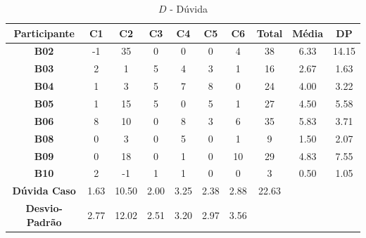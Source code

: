 \begin{table}[htbp]
	\centering
	\caption{$D$ - Dúvida}
	\begin{tabular}{|c|c|c|c|c|c|c|ccc}
		\hline
		\rowcolor[HTML]{D9D9D9} 
		\cellcolor[HTML]{D0CECE}\textbf{Participante} & \textbf{C1} & \textbf{C2} & \textbf{C3} & \textbf{C4} & \textbf{C5} & \textbf{C6} & \multicolumn{1}{c|}{\cellcolor[HTML]{D9D9D9}\textbf{Total}} & \multicolumn{1}{c|}{\cellcolor[HTML]{D9D9D9}\textbf{Média}} & \multicolumn{1}{c|}{\cellcolor[HTML]{D9D9D9}\textbf{DP}} \\ \hline
		\cellcolor[HTML]{F2F2F2}\textbf{B02} & -1 & 35 & 0 & 0 & 0 & 4 & \multicolumn{1}{c|}{38} & \multicolumn{1}{c|}{6.33} & \multicolumn{1}{c|}{14.15} \\ \hline
		\rowcolor[HTML]{D9D9D9} 
		\cellcolor[HTML]{F2F2F2}\textbf{B03} & 2 & 1 & 5 & 4 & 3 & 1 & \multicolumn{1}{c|}{\cellcolor[HTML]{D9D9D9}16} & \multicolumn{1}{c|}{\cellcolor[HTML]{D9D9D9}2.67} & \multicolumn{1}{c|}{\cellcolor[HTML]{D9D9D9}1.63} \\ \hline
		\cellcolor[HTML]{F2F2F2}\textbf{B04} & 1 & 3 & 5 & 7 & 8 & 0 & \multicolumn{1}{c|}{24} & \multicolumn{1}{c|}{4.00} & \multicolumn{1}{c|}{3.22} \\ \hline
		\rowcolor[HTML]{D9D9D9} 
		\cellcolor[HTML]{F2F2F2}\textbf{B05} & 1 & 15 & 5 & 0 & 5 & 1 & \multicolumn{1}{c|}{\cellcolor[HTML]{D9D9D9}27} & \multicolumn{1}{c|}{\cellcolor[HTML]{D9D9D9}4.50} & \multicolumn{1}{c|}{\cellcolor[HTML]{D9D9D9}5.58} \\ \hline
		\cellcolor[HTML]{F2F2F2}\textbf{B06} & 8 & 10 & 0 & 8 & 3 & 6 & \multicolumn{1}{c|}{35} & \multicolumn{1}{c|}{5.83} & \multicolumn{1}{c|}{3.71} \\ \hline
		\rowcolor[HTML]{D9D9D9} 
		\cellcolor[HTML]{F2F2F2}\textbf{B08} & 0 & 3 & 0 & 5 & 0 & 1 & \multicolumn{1}{c|}{\cellcolor[HTML]{D9D9D9}9} & \multicolumn{1}{c|}{\cellcolor[HTML]{D9D9D9}1.50} & \multicolumn{1}{c|}{\cellcolor[HTML]{D9D9D9}2.07} \\ \hline
		\cellcolor[HTML]{F2F2F2}\textbf{B09} & 0 & 18 & 0 & 1 & 0 & 10 & \multicolumn{1}{c|}{29} & \multicolumn{1}{c|}{4.83} & \multicolumn{1}{c|}{7.55} \\ \hline
		\rowcolor[HTML]{D9D9D9} 
		\cellcolor[HTML]{F2F2F2}\textbf{B10} & 2 & -1 & 1 & 1 & 0 & 0 & \multicolumn{1}{c|}{\cellcolor[HTML]{D9D9D9}3} & \multicolumn{1}{c|}{\cellcolor[HTML]{D9D9D9}0.50} & \multicolumn{1}{c|}{\cellcolor[HTML]{D9D9D9}1.05} \\ \hline
		\textbf{Dúvida Caso} & 1.63 & 10.50 & 2.00 & 3.25 & 2.38 & 2.88 & \multicolumn{1}{c|}{22.63} & \multicolumn{1}{l}{} & \multicolumn{1}{l}{} \\ \cline{1-8}
		\cellcolor[HTML]{D9D9D9}\textbf{Desvio-Padrão} & \cellcolor[HTML]{D9D9D9}2.77 & \cellcolor[HTML]{D9D9D9}12.02 & \cellcolor[HTML]{D9D9D9}2.51 & \cellcolor[HTML]{D9D9D9}3.20 & \cellcolor[HTML]{D9D9D9}2.97 & \cellcolor[HTML]{D9D9D9}3.56 & \multicolumn{1}{l}{} & \multicolumn{1}{l}{} & \multicolumn{1}{l}{} \\ \cline{1-7}
	\end{tabular}
	\label{tab:F3_A3_DUVIDA}
\end{table}


